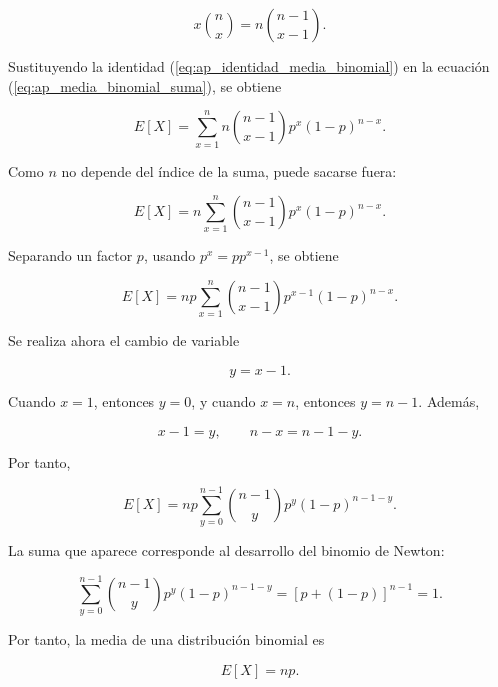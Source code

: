 \documentclass[12pt,a4paper]{article}
\begin{document}
\begin{equation}
    x\binom{n}{x}
    =
    n\binom{n-1}{x-1}.
\end{equation}

Sustituyendo la identidad (\ref{eq:ap_identidad_media_binomial}) en la ecuación (\ref{eq:ap_media_binomial_suma}), se obtiene

\begin{equation}
    E[X]
    =
    \sum_{x=1}^{n}
    n\binom{n-1}{x-1}p^x(1-p)^{n-x}.
\end{equation}

Como $n$ no depende del índice de la suma, puede sacarse fuera:

\begin{equation}
    E[X]
    =
    n\sum_{x=1}^{n}
    \binom{n-1}{x-1}p^x(1-p)^{n-x}.
\end{equation}

Separando un factor $p$, usando $p^x=pp^{x-1}$, se obtiene

\begin{equation}
    E[X]
    =
    np\sum_{x=1}^{n}
    \binom{n-1}{x-1}p^{x-1}(1-p)^{n-x}.
\end{equation}

Se realiza ahora el cambio de variable

\begin{equation}
    y=x-1.
\end{equation}

Cuando $x=1$, entonces $y=0$, y cuando $x=n$, entonces $y=n-1$. Además,

\begin{equation}
    x-1=y,
    \qquad
    n-x=n-1-y.
\end{equation}

Por tanto,

\begin{equation}
    E[X]
    =
    np\sum_{y=0}^{n-1}
    \binom{n-1}{y}p^y(1-p)^{n-1-y}.
\end{equation}

La suma que aparece corresponde al desarrollo del binomio de Newton:

\begin{equation}
    \sum_{y=0}^{n-1}
    \binom{n-1}{y}p^y(1-p)^{n-1-y}
    =
    \left[p+(1-p)\right]^{n-1}
    =
    1.
\end{equation}

Por tanto, la media de una distribución binomial es

\begin{equation}
    E[X]=np.
    \label{eq:ap_media_binomial}
\end{equation}
\end{document}
